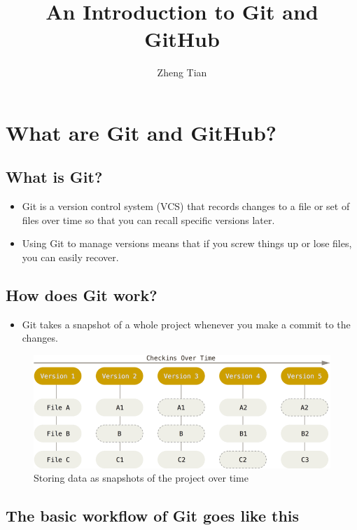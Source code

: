 \documentclass[a4paper,11pt]{article}
\author{Zheng Tian}
\date{}
\title{An Introduction to Git and GitHub}
\begin{document}
\maketitle


\section{What are Git and GitHub?}
\label{sec:orgf3949f2}

\subsection{What is Git?}
\label{sec:orgf22681d}

\begin{itemize}
\item Git is a version control system (VCS) that records changes to a file
or set of files over time so that you can recall specific versions
later.

\item Using Git to manage versions means that if you screw things up or
lose files, you can easily recover.
\end{itemize}

\subsection{How does Git work?}
\label{sec:orgd5f4b4c}

\begin{itemize}
\item Git takes a snapshot of a whole project whenever you make a commit
to the changes.
\end{itemize}
\begin{figure}[htbp]
\centering
\includegraphics[width=.9\linewidth]{img/snapshots.png}
\caption{\label{fig:org2bd9b65}
Storing data as snapshots of the project over time}
\end{figure}

\subsection{The basic workflow of Git goes like this}
\label{sec:orge82cbb1}
\end{document}
